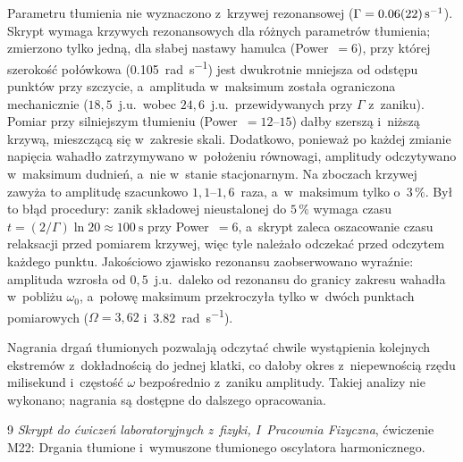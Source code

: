 \documentclass[12pt, a4paper]{article}
\begin{document}
Parametru tłumienia nie wyznaczono z~krzywej rezonansowej
($\Gamma = \SI{0.06 \pm 0.22}{\per\second}$). Skrypt wymaga krzywych rezonansowych dla
różnych parametrów tłumienia; zmierzono tylko jedną, dla słabej nastawy hamulca
(Power~$=6$), przy której szerokość połówkowa
(\SI{0.105}{\radian\per\second}) jest dwukrotnie mniejsza od odstępu punktów przy
szczycie, a~amplituda w~maksimum została ograniczona mechanicznie ($18{,}5$~j.u.\
wobec $24{,}6$~j.u.\ przewidywanych przy $\Gamma$ z~zaniku). Pomiar przy silniejszym
tłumieniu (Power~$= 12$--$15$) dałby szerszą i~niższą krzywą, mieszczącą się w~zakresie
skali. Dodatkowo, ponieważ po każdej zmianie napięcia wahadło zatrzymywano
w~położeniu równowagi, amplitudy odczytywano w~maksimum dudnień, a~nie w~stanie
stacjonarnym. Na zboczach krzywej zawyża to amplitudę szacunkowo $1{,}1$--$1{,}6$~raza,
a~w~maksimum tylko o~$3\,\%$. Był to błąd procedury: zanik składowej nieustalonej
do $5\,\%$ wymaga czasu $t = (2/\Gamma)\ln 20 \approx \SI{100}{\second}$ przy
Power~$=6$, a~skrypt zaleca oszacowanie czasu relaksacji przed pomiarem krzywej,
więc tyle należało odczekać przed odczytem każdego punktu.
Jakościowo zjawisko rezonansu zaobserwowano wyraźnie: amplituda wzrosła od
$0{,}5$~j.u.\ daleko od rezonansu do granicy zakresu wahadła w~pobliżu $\omega_0$,
a~połowę maksimum przekroczyła tylko w~dwóch punktach pomiarowych
($\Omega = 3{,}62$ i~\SI{3.82}{\radian\per\second}).

Nagrania drgań tłumionych pozwalają odczytać chwile wystąpienia kolejnych ekstremów
z~dokładnością do jednej klatki, co dałoby okres z~niepewnością rzędu milisekund
i~częstość $\omega$ bezpośrednio z~zaniku amplitudy. Takiej analizy nie wykonano;
nagrania są dostępne do dalszego opracowania.

\begin{thebibliography}{9}
    \textit{Skrypt do ćwiczeń laboratoryjnych z~fizyki, I~Pracownia Fizyczna}, ćwiczenie M22:
    Drgania tłumione i~wymuszone tłumionego oscylatora harmonicznego.
\end{thebibliography}
\end{document}
